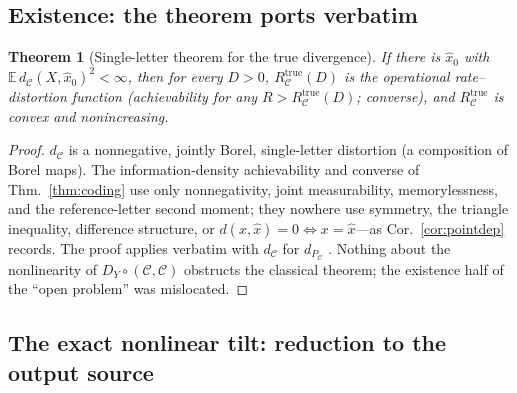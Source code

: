 \documentclass[11pt]{article}
\newtheorem{theorem}{Theorem}
\theoremstyle{definition}
\theoremstyle{remark}
\newcommand{\PC}{P_{\mathcal{C}}}
\newcommand{\E}{\mathbb{E}}
\begin{document}
\subsection{Existence: the theorem ports verbatim}

\begin{theorem}[Single-letter theorem for the true divergence]\label{thm:B1}
If there is $\hat x_0$ with $\E\,d_{\mathcal{C}}(X,\hat x_0)^2<\infty$, then for every
$D>0$, $R_{\mathcal{C}}^{\mathrm{true}}(D)$ is the operational rate--distortion
function (achievability for any $R>R_{\mathcal{C}}^{\mathrm{true}}(D)$; converse), and
$R_{\mathcal{C}}^{\mathrm{true}}$ is convex and nonincreasing.
\end{theorem}
\begin{proof}
$d_{\mathcal{C}}$ is a nonnegative, jointly Borel, single-letter distortion (a
composition of Borel maps). The information-density achievability and converse of
Thm.~\ref{thm:coding} use only nonnegativity, joint measurability, memorylessness, and
the reference-letter second moment; they nowhere use symmetry, the triangle
inequality, difference structure, or $d(x,\hat x)=0\iff x=\hat x$---as
Cor.~\ref{cor:pointdep} records. The proof applies verbatim with $d_{\mathcal{C}}$ for
$d_{\PC}$ \cite{csiszar1974}. Nothing about the nonlinearity of
$D_Y\circ(\mathcal{C},\mathcal{C})$ obstructs the classical theorem; the existence half
of the ``open problem'' was mislocated.
\end{proof}

\subsection{The exact nonlinear tilt: reduction to the output source}
\end{document}
